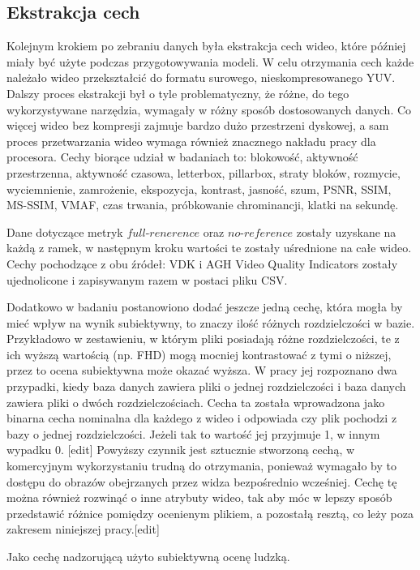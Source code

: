 \subsection{Ekstrakcja cech}
Kolejnym krokiem po zebraniu danych była ekstrakcja cech wideo, które później miały być użyte podczas przygotowywania modeli. W celu otrzymania cech każde należało wideo przekształcić do formatu surowego, nieskompresowanego YUV. Dalszy proces ekstrakcji był o tyle problematyczny, że różne, do tego wykorzystywane narzędzia, wymagały w różny sposób dostosowanych danych. Co więcej wideo bez kompresji zajmuje bardzo dużo przestrzeni dyskowej, a sam proces przetwarzania wideo wymaga również znacznego nakładu pracy dla procesora. Cechy biorące udział w badaniach to: blokowość, aktywność przestrzenna, aktywność czasowa, letterbox, pillarbox, straty bloków, rozmycie, wyciemnienie, zamrożenie, ekspozycja, kontrast, jasność, szum, PSNR, SSIM, MS-SSIM, VMAF, czas trwania, próbkowanie chrominancji, klatki na sekundę.\par
Dane dotyczące metryk $full$-$renerence$ oraz $no$-$reference$ zostały uzyskane na każdą z ramek, w następnym kroku wartości te zostały uśrednione na całe wideo. Cechy pochodzące z obu źródeł: VDK i AGH Video Quality Indicators zostały ujednolicone i zapisywanym razem w postaci pliku CSV.\par
Dodatkowo w badaniu postanowiono dodać jeszcze jedną cechę, która mogła by mieć wpływ na wynik subiektywny, to znaczy ilość różnych rozdzielczości w bazie. Przykładowo w zestawieniu, w którym pliki posiadają różne rozdzielczości, te z ich wyższą wartością (np. FHD) mogą mocniej kontrastować z tymi o niższej, przez to ocena subiektywna może okazać wyższa. W pracy jej rozpoznano dwa przypadki, kiedy baza danych zawiera pliki o jednej rozdzielczości i baza danych zawiera pliki o dwóch rozdzielczościach. Cecha ta została wprowadzona jako binarna cecha nominalna dla każdego z wideo i odpowiada czy plik pochodzi z bazy o jednej rozdzielczości. Jeżeli tak to wartość jej przyjmuje 1, w innym wypadku 0. [edit] Powyższy czynnik jest sztucznie stworzoną cechą, w komercyjnym wykorzystaniu trudną do otrzymania, ponieważ wymagało by to dostępu do obrazów obejrzanych przez widza bezpośrednio wcześniej. Cechę tę można również rozwinąć o inne atrybuty wideo, tak aby móc w lepszy sposób przedstawić różnice pomiędzy ocenienym plikiem, a pozostałą resztą, co leży poza zakresem niniejszej pracy.[edit] \par
Jako cechę nadzorującą użyto subiektywną ocenę ludzką.\par

